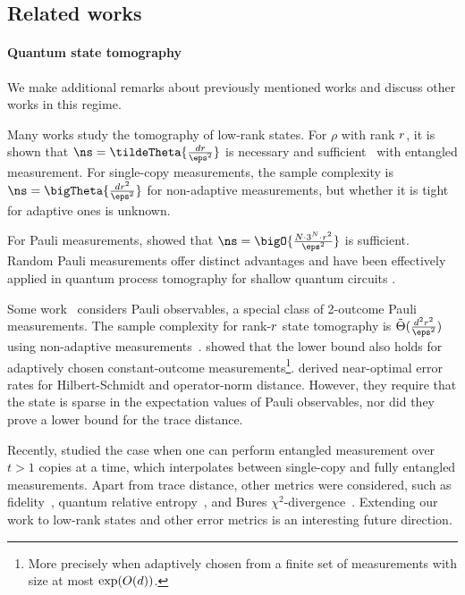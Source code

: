 \subsection{Related works}
\paragraph{Quantum state tomography} We make additional remarks about previously mentioned works and discuss other works in this regime.

Many works study the tomography of low-rank states. 
For $\rho$ with rank ${r}$, it is shown that $\ns = \tildeTheta{\frac{\dims \rk}{\eps^2}}$ is necessary and sufficient~\cite{HaahHJWY17,ODonnellW16} with entangled measurement. 
For single-copy measurements, the sample complexity is $\ns=\bigTheta{\frac{\dims \rk^2}{\eps^2}}$ for non-adaptive measurements, but whether it is tight for adaptive ones is unknown. 

For Pauli measurements, \cite{guctua2020fast} showed that $\ns=\bigO{\frac{\nqubits \cdot 3^\nqubits\cdot \rk^2}{\eps^2}}$ is sufficient. 
Random Pauli measurements offer distinct advantages \cite{Elben_2022} and have been effectively applied in quantum process tomography for shallow quantum circuits \cite{yu2023learningmarginalssuffices,Huang_2024}. 

Some work~\cite{compressed,Flammia_2012} considers Pauli observables, a special class of 2-outcome Pauli measurements. The sample complexity for rank-${r}$ state tomography is ${\tilde{{\Theta}}}(\frac{\dims^2 r^2}{\eps^2})$ using non-adaptive measurements~\cite{Flammia_2012}. \cite{lowe2022lower} showed that the lower bound also holds for adaptively chosen constant-outcome measurements\footnote{More precisely when adaptively chosen from a finite set of measurements with size at most $\exp(O(d))$.}. \cite{cai2016optimal} derived near-optimal error rates for Hilbert-Schmidt and operator-norm distance. However, they require that the state is sparse in the expectation values of Pauli observables, nor did they prove a lower bound for the trace distance. 


Recently, \cite{Chen0L24memory} studied the case when one can perform entangled measurement over $t>1$ copies at a time, which interpolates between single-copy and fully entangled measurements. Apart from trace distance, other metrics were considered, such as fidelity~\cite{HaahHJWY17,chen2023does, Yuen_2023}, quantum relative entropy~\cite{flamian2023tomography}, and Bures $\chi^2$-divergence~\cite{flamian2023tomography}. Extending our work to low-rank states and other error metrics is an interesting future direction.
 



